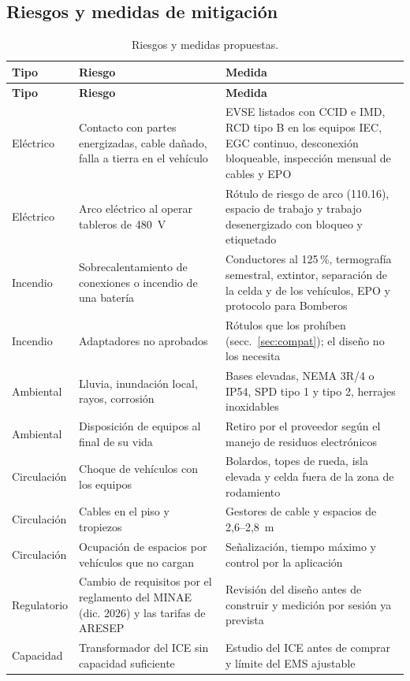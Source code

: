 \subsection{Riesgos y medidas de mitigación}
{\small
\begin{longtable}{L{2.2cm}L{5.4cm}L{7.4cm}}
\caption{Riesgos y medidas propuestas.}\label{tab:riesgos}\\
\toprule
\textbf{Tipo} & \textbf{Riesgo} & \textbf{Medida}\\
\midrule\endfirsthead
\toprule
\textbf{Tipo} & \textbf{Riesgo} & \textbf{Medida}\\
\midrule\endhead
Eléctrico & Contacto con partes energizadas, cable dañado, falla a tierra en el vehículo & EVSE listados con CCID e IMD, RCD tipo B en los equipos IEC, EGC continuo, desconexión bloqueable, inspección mensual de cables y EPO\\
Eléctrico & Arco eléctrico al operar tableros de 480~V & Rótulo de riesgo de arco (110.16), espacio de trabajo y trabajo desenergizado con bloqueo y etiquetado\\
Incendio & Sobrecalentamiento de conexiones o incendio de una batería & Conductores al 125\,\%, termografía semestral, extintor, separación de la celda y de los vehículos, EPO y protocolo para Bomberos\\
Incendio & Adaptadores no aprobados & Rótulos que los prohíben (secc.~\ref{sec:compat}); el diseño no los necesita\\
Ambiental & Lluvia, inundación local, rayos, corrosión & Bases elevadas, NEMA 3R/4 o IP54, SPD tipo 1 y tipo 2, herrajes inoxidables\\
Ambiental & Disposición de equipos al final de su vida & Retiro por el proveedor según el manejo de residuos electrónicos\\
Circulación & Choque de vehículos con los equipos & Bolardos, topes de rueda, isla elevada y celda fuera de la zona de rodamiento\\
Circulación & Cables en el piso y tropiezos & Gestores de cable y espacios de 2,6--2,8~m\\
Circulación & Ocupación de espacios por vehículos que no cargan & Señalización, tiempo máximo y control por la aplicación\\
Regulatorio & Cambio de requisitos por el reglamento del MINAE (dic. 2026) y las tarifas de ARESEP & Revisión del diseño antes de construir y medición por sesión ya prevista\\
Capacidad & Transformador del ICE sin capacidad suficiente & Estudio del ICE antes de comprar y límite del EMS ajustable\\
\bottomrule
\end{longtable}}

